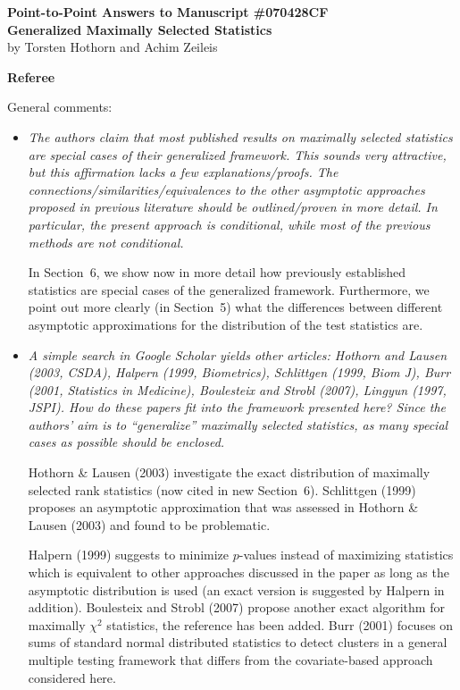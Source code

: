 \documentclass[11pt,a4paper]{article}
\begin{document}


\begin{center}
\textbf{\large Point-to-Point Answers to Manuscript \#070428CF \\
Generalized Maximally Selected Statistics} \\
by Torsten Hothorn and Achim Zeileis
\end{center}

\vspace*{1cm}

\textbf{\large Referee}

General comments:

\begin{itemize}

  \item \textit{The authors claim that most published results on maximally selected
        statistics are special cases of their generalized framework. This sounds very
	attractive, but this affirmation lacks a few explanations/proofs. The
        connections/similarities/equivalences to the other asymptotic approaches
        proposed in previous literature should be outlined/proven in more detail. In
        particular, the present approach is conditional, while most of the previous
        methods are not conditional.}
	
	In Section~6, we show now in more detail how previously established statistics
	are special cases of the generalized framework. Furthermore, we point out 
	more clearly (in Section~5) what the differences between different asymptotic approximations
	for the distribution of the test statistics are.
	
  \item \textit{A simple search in Google Scholar yields other articles: Hothorn and
        Lausen (2003, CSDA), Halpern (1999, Biometrics), Schlittgen (1999, Biom J),
	Burr (2001, Statistics in Medicine), Boulesteix and Strobl (2007),
	Lingyun (1997, JSPI). How do these papers fit into the framework presented here?
	Since the authors' aim is to ``generalize'' maximally selected statistics, as
	many special cases as possible should be enclosed.}
	
        Hothorn \& Lausen (2003) investigate the exact distribution of maximally
        selected rank statistics (now cited in new Section~6). Schlittgen (1999)
        proposes an asymptotic approximation that was assessed in Hothorn \& Lausen (2003)
	and found to be problematic. 

        Halpern (1999) suggests to minimize $p$-values instead of maximizing 
        statistics which is equivalent to other approaches discussed in the paper 
        as long as the asymptotic distribution is used (an exact version is suggested 
        by Halpern in addition).
        Boulesteix and Strobl (2007) propose another exact algorithm for maximally
        $\chi^2$ statistics, the reference has been added.
        Burr (2001) focuses on sums of standard normal distributed statistics
        to detect clusters in a general multiple testing framework that differs
	from the covariate-based approach considered here.
	

\end{itemize}
\end{document}
